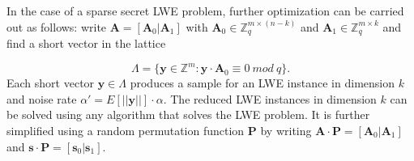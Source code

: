 \begin{comment}
The general dual strategy, without exploiting small secrets, requires
\begin{equation*}
    \log \delta_0 =\frac{\log {(\frac{{-2\log {\epsilon}}}{\alpha^2 q}})}{4n}
\end{equation*}

according to [APS15]. For Homomorphic encryption library HElib’s choice of $8 = \alpha q$ and $h = 64$ and setting $\epsilon$ constant, this expression simplifies to
\begin{equation*}
    \log \delta_0 = \frac{\log {q} + C_d}{4n}
\end{equation*}
for some constant $C_d$. On the other hand, Lemma above simplifies to
\begin{equation*}
    \log \delta_0 = \frac{\log {q} + \frac{1}{2}\log {n} + C_m}{4n}
\end{equation*}

for some constant $C_m < C_d$.
For a circuit of depth $L$, BGV requires $\log {q} = L\log {n} + O(L)$ [GHS12b, Appendix C.2]. Applying Lemma 2, we get that
\begin{equation*}
    lim_{k \rightarrow \infty} \frac{cost_m}{cost_d}= lim_{n \rightarrow \infty}\frac{cost_m}{cost_d}=\frac{2L}{2L+1}
\end{equation*}

where $cost_d$ is the log cost of the standard dual attack, $cost_m$ is the log cost under Lemma above and $\kappa$ the security parameter. The same analysis applies to any constant $h$.
\end{comment}













In the case of a sparse secret LWE problem, further optimization can be carried out as follows: write $\pmb{A} = [\pmb{A}_0 | \pmb{A}_1]$ with $\pmb{A}_0 \in \mathbb{Z}^{m\times(n-k)}_q$ and $\pmb{A}_1 \in \mathbb{Z}^{m\times k}_q$ and find a short vector in the lattice

\begin{equation*}
    \Lambda = \{\pmb{y} \in \mathbb{Z}^m : \pmb{y} \cdot \pmb{A}_0 \equiv 0 \ mod\ q\}.
\end{equation*}
Each short vector $\pmb{y} \in \Lambda$ produces a sample for an LWE instance in dimension $k$ and noise rate $\alpha'=E[||\pmb{y}||]\cdot \alpha$. The reduced LWE instances in dimension $k$ can be solved using any algorithm that solves the LWE problem. It is further simplified using a random permutation function $\pmb{P}$ by writing $\pmb{A} \cdot \pmb{P}=[\pmb{A}_0|\pmb{A}_1]$ and $\pmb{s} \cdot \pmb{P}=[\pmb{s}_0|\pmb{s}_1]$.

